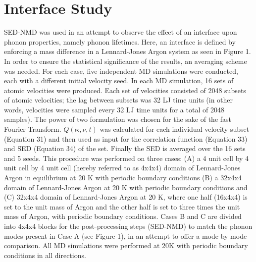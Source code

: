 \chapter{Interface Study}

SED-NMD was used in an attempt to observe the effect of an interface upon phonon properties, namely phonon lifetimes. Here, an interface is defined by enforcing a mass difference in a Lennard-Jones Argon system as seen in Figure 1. In order to ensure the statistical significance of the results, an averaging scheme was needed. For each case, five independent MD simulations were conducted, each with a different initial velocity seed. In each MD simulation, 16 sets of atomic velocities were produced. Each set of velocities consisted of 2048 subsets of atomic velocities; the lag between subsets was 32 LJ time units (in other words, velocities were sampled every 32 LJ time units for a total of 2048 samples). The power of two formulation was chosen for the sake of the fast Fourier Transform. $\dot{Q}(\bm{\kappa},\nu,t)$ was calculated for each individual velocity subset (Equation 31) and then used as input for the correlation function (Equation 33) and SED (Equation 34) of the set. Finally the SED is averaged over the 16 sets and 5 seeds. This procedure was performed on three cases: (A) a 4 unit cell by 4 unit cell by 4 unit cell (hereby referred to as 4x4x4) domain of Lennard-Jones Argon in equilibrium at 20 K with periodic boundary conditions (B) a 32x4x4 domain of Lennard-Jones Argon at 20 K with periodic boundary conditions and (C) 32x4x4 domain of Lennard-Jones Argon at 20 K, where one half (16x4x4) is set to the unit mass of Argon and the other half is set to three times the unit mass of Argon, with periodic boundary conditions. Cases B and C are divided into 4x4x4 blocks for the post-processing steps (SED-NMD) to match the phonon modes present in Case A (see Figure 1), in an attempt to offer a mode by mode comparison. All MD simulations were performed at 20K with periodic boundary conditions in all directions.


